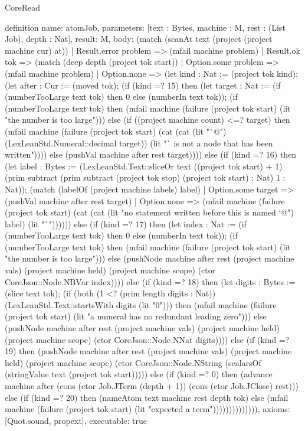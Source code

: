 \begin{lexlean}{CoreRead}
\begin{semanticmodule}
definition{
  name: atomJob,
  parameters: [text : Bytes, machine : M, rest : (List Job), depth : Nat],
  result: M,
  body: (match (scanAt text (project (project machine cur) at))
    | Result.error problem => (mfail machine problem)
    | Result.ok tok => (match (deep depth (project tok start))
      | Option.some problem => (mfail machine problem)
      | Option.none => (let kind : Nat := (project tok kind); (let after : Cur := (moved tok); (if (kind =? 15) then (let target : Nat := (if (numberTooLarge text tok) then 0 else (numberIn text tok)); (if (numberTooLarge text tok) then (mfail machine (failure (project tok start) (lit "the number is too large"))) else (if ((project machine count) <=? target) then (mfail machine (failure (project tok start) (cat (cat (lit "`@") (LexLeanStd.Numeral::decimal target)) (lit "` is not a node that has been written")))) else (pushVal machine after rest target)))) else (if (kind =? 16) then (let label : Bytes := (LexLeanStd.Text::sliceOr text ((project tok start) + 1) (prim subtract (prim subtract (project tok stop) (project tok start) : Nat) 1 : Nat)); (match (labelOf (project machine labels) label)
        | Option.some target => (pushVal machine after rest target)
        | Option.none => (mfail machine (failure (project tok start) (cat (cat (lit "no statement written before this is named `@") label) (lit "`")))))) else (if (kind =? 17) then (let index : Nat := (if (numberTooLarge text tok) then 0 else (numberIn text tok)); (if (numberTooLarge text tok) then (mfail machine (failure (project tok start) (lit "the number is too large"))) else (pushNode machine after rest (project machine vals) (project machine held) (project machine scope) (ctor CoreJson::Node.NBVar index)))) else (if (kind =? 18) then (let digits : Bytes := (slice text tok); (if (both (1 <? (prim length digits : Nat)) (LexLeanStd.Text::startsWith digits (lit "0"))) then (mfail machine (failure (project tok start) (lit "a numeral has no redundant leading zero"))) else (pushNode machine after rest (project machine vals) (project machine held) (project machine scope) (ctor CoreJson::Node.NNat digits)))) else (if (kind =? 19) then (pushNode machine after rest (project machine vals) (project machine held) (project machine scope) (ctor CoreJson::Node.NString (scalarsOf (stringValue text (project tok start))))) else (if (kind =? 0) then (advance machine after (cons (ctor Job.JTerm (depth + 1)) (cons (ctor Job.JClose) rest))) else (if (kind =? 20) then (nameAtom text machine rest depth tok) else (mfail machine (failure (project tok start) (lit "expected a term")))))))))))))),
  axioms: [Quot.sound, propext],
  executable: true
}


\end{semanticmodule}
\end{lexlean}
